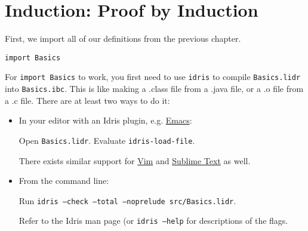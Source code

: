 \chapter{Induction: Proof by
Induction}\label{induction-proof-by-induction}

First, we import all of our definitions from the previous chapter.

\begin{verbatim}
import Basics
\end{verbatim}

For \texttt{import Basics} to work, you first need to use
\texttt{idris} to compile \texttt{Basics.lidr}
into \texttt{Basics.ibc}. This is like making a .class file
from a .java file, or a .o file from a .c file. There are at least two
ways to do it:

\begin{itemize}
\item
  In your editor with an Idris plugin, e.g.
  \href{https://github.com/idris-hackers/idris-mode}{Emacs}:

  Open \texttt{Basics.lidr}. Evaluate
  \texttt{idris-load-file}.

  There exists similar support for
  \href{https://github.com/idris-hackers/idris-vim}{Vim} and
  \href{https://github.com/idris-hackers/idris-sublime}{Sublime Text} as
  well.
\item
  From the command line:

  Run
  \texttt{idris --check --total --noprelude src/Basics.lidr}.

  Refer to the Idris man page (or \texttt{idris --help} for
  descriptions of the flags.
\end{itemize}
